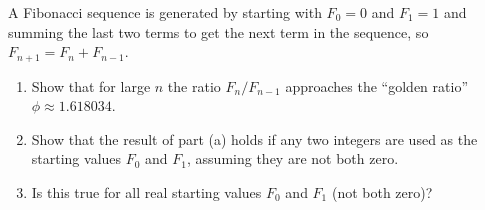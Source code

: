 

A Fibonacci sequence is generated by starting with $F_0=0$
and $F_1=1$ and summing the last two terms to get the next term in the
sequence, so $F_{n+1} = F_{n} + F_{n-1}$.   

\begin{enumerate}
\item Show that for large $n$ the ratio $F_n / F_{n-1}$ approaches the
``golden ratio'' $\phi \approx 1.618034$.

\item Show that the result of part (a) holds if any two integers are used as
the starting values $F_0$ and $F_1$, assuming they are not both zero.

\item Is this true for all real starting values $F_0$ and $F_1$ (not both
zero)?

\end{enumerate}

